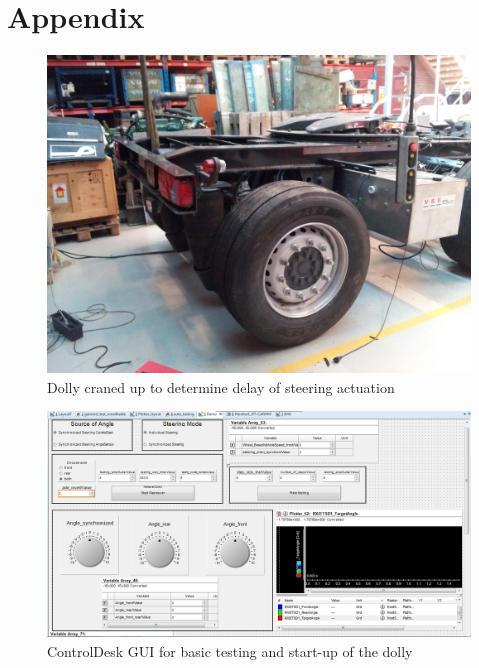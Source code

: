 \documentclass[ExampleMasters.tex]{subfiles}
\begin{document}
\clearpage
\appendix 
{}

\chapter{Appendix}
\label{chap:Appendix}

\begin{figure}[h]
\centering
\includegraphics[width=1\linewidth]{figures/dolly_craned_up}
\caption{Dolly craned up to determine delay of steering actuation}

\label{fig:dolly_craned_up}
\end{figure}

\begin{figure}[h]
	\centering
	\includegraphics[width=1\linewidth]{figures/CD_Layout}
	\caption{ControlDesk GUI for basic testing and start-up of the dolly}
	
	\label{fig:control_desk_GUI}
\end{figure}
\end{document}
